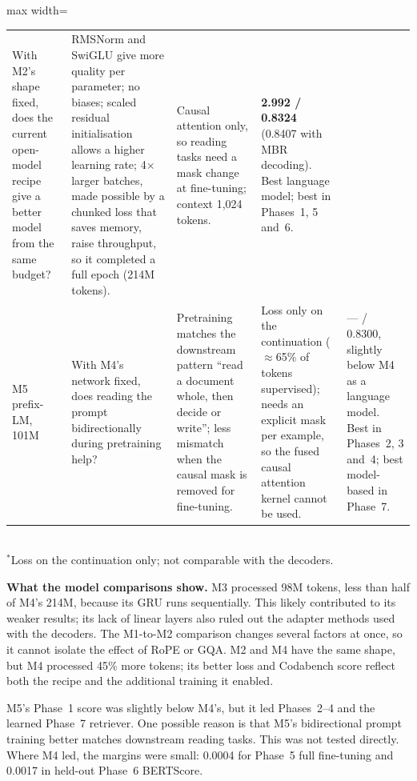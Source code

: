 \documentclass[11pt, oneside]{article}
\begin{document}
\begin{table}[H]
\begin{adjustbox}{max width=\textwidth}
\begin{tabular}{>{\raggedright\arraybackslash}p{1.2cm}>{\raggedright\arraybackslash}p{3.2cm}>{\raggedright\arraybackslash}p{3.6cm}>{\raggedright\arraybackslash}p{3.6cm}>{\raggedright\arraybackslash}p{3.4cm}}
With M2's shape fixed, does the current open-model recipe give a better model from the same budget? &
RMSNorm and SwiGLU give more quality per parameter; no biases; scaled residual initialisation allows a higher learning
rate; 4$\times$ larger batches, made possible by a chunked loss that saves memory, raise throughput, so it completed a full epoch (214M tokens). &
Causal attention only, so reading tasks need a mask change at fine-tuning; context 1{,}024 tokens. &
\textbf{2.992 / 0.8324} (0.8407 with MBR decoding). Best language model; best in Phases~1, 5 and~6.\\
\addlinespace
M5 prefix-LM, 101M &
With M4's network fixed, does reading the prompt bidirectionally during pretraining help? &
Pretraining matches the downstream pattern ``read a document whole, then decide or write''; less mismatch when the
causal mask is removed for fine-tuning. &
Loss only on the continuation ($\approx$65\% of tokens supervised); needs an explicit mask per example, so the fused
causal attention kernel cannot be used. &
--- / 0.8300, slightly below M4 as a language model. Best in Phases~2, 3 and~4; best model-based in Phase~7.\\
\bottomrule
\end{tabular}
\end{adjustbox}
\\[1pt]{\footnotesize $^*$Loss on the continuation only; not comparable with the decoders.}
\end{table}

\textbf{What the model comparisons show.} M3 processed 98M tokens, less than half of M4's 214M, because its GRU
runs sequentially. This likely contributed to its weaker results; its lack of linear layers also ruled out the
adapter methods used with the decoders. The M1-to-M2 comparison changes several factors at once, so it cannot
isolate the effect of RoPE or GQA. M2 and M4 have the same shape, but M4 processed 45\% more tokens; its better
loss and Codabench score reflect both the recipe and the additional training it enabled.

M5's Phase~1 score was slightly below M4's, but it led Phases~2--4 and the learned Phase~7 retriever. One possible
reason is that M5's bidirectional prompt training better matches downstream reading tasks. This was not tested
directly. Where M4 led, the margins were small: 0.0004 for Phase~5 full fine-tuning and 0.0017 in held-out Phase~6
BERTScore.
\end{document}
